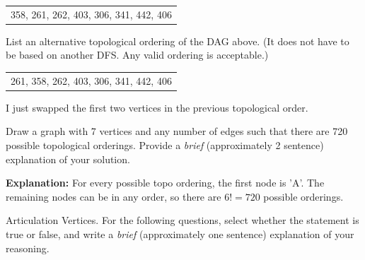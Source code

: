 \documentclass[12pt]{exam}
\newcommand{\stars}[1]{%
    \foreach \n in {1,...,#1}{%
        $\filledstar$%
    }%
}
\begin{document}
\begin{questions}
\begin{parts}
        \begin{tabular}{c}
            358, 261, 262, 403, 306, 341, 442, 406
        \end{tabular}

        \item List an alternative topological ordering of the DAG above. (It does not have to be based on another DFS. Any valid ordering is acceptable.)

        \begin{tabular}{c}
            261, 358, 262, 403, 306, 341, 442, 406
        \end{tabular}

        I just swapped the first two vertices in the previous topological order.

    \end{parts}

    \clearpage

    \question[10] [W3, \stars{2}] Draw a graph with 7 vertices and any number of edges such that there are 720 possible topological orderings. Provide a \textit{brief} (approximately 2 sentence) explanation of your solution.

    \begin{figure}[H]
        \center
    \end{figure}

    \textbf{Explanation:} For every possible topo ordering, the first node is 'A'. The remaining nodes can be in any order, so there are $6! = 720$ possible orderings.

    \clearpage

    \question[9] [W4, \stars{2}] Articulation Vertices.
    For the following questions, select whether the statement is true or false,
    and write a \textit{brief} (approximately one sentence) explanation of your reasoning.


\end{questions}
\end{document}
